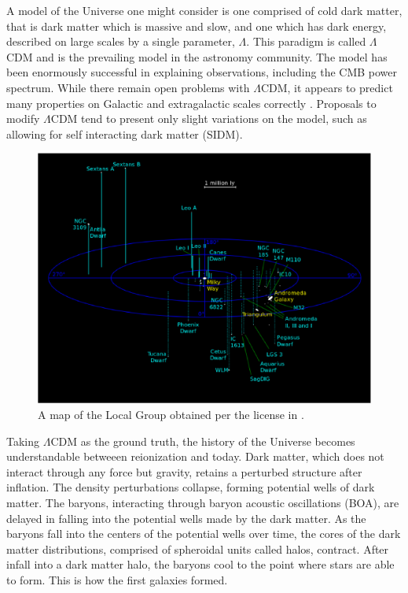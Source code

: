 A model of the Universe one might consider is one comprised of cold dark matter, that is dark matter which is massive and slow, and one which has dark energy, described on large scales by a single parameter, $\Lambda$. This paradigm is called $\Lambda$CDM and is the prevailing model in the astronomy community. The model has been enormously successful in explaining observations, including the CMB power spectrum. While there remain open problems with $\Lambda$CDM, it appears to predict many properties on Galactic and extragalactic scales correctly \citep{kolb_turner,dodelson}. Proposals to modify $\Lambda$CDM tend to present only slight variations on the model, such as allowing for self interacting dark matter (SIDM).
\begin{figure}
	\includegraphics[width=\textwidth]{../figures/local_group}
	\caption{A map of the Local Group obtained per the license in \citet{local_group_map}.}\label{fig:local_group}
\end{figure}

Taking $\Lambda$CDM as the ground truth, the history of the Universe becomes understandable betweeen reionization and today. Dark matter, which does not interact through any force but gravity, retains a perturbed structure after inflation. The density perturbations collapse, forming potential wells of dark matter. The baryons, interacting through baryon acoustic oscillations (BOA), are delayed in falling into the potential wells made by the dark matter. As the baryons fall into the centers of the potential wells over time, the cores of the dark matter distributions, comprised of spheroidal units called halos, contract. After infall into a dark matter halo, the baryons cool to the point where stars are able to form. This is how the first galaxies formed.

